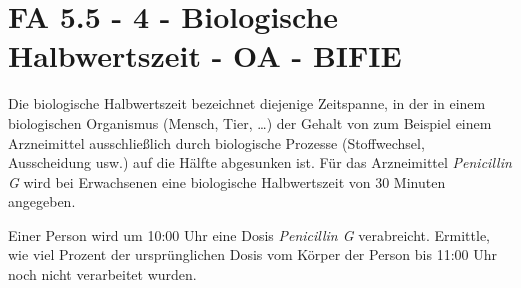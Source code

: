 \section{FA 5.5 - 4 - Biologische Halbwertszeit - OA - BIFIE}


\begin{beispiel}[FA 5.5]{1} %
Die biologische Halbwertszeit bezeichnet diejenige Zeitspanne, in der in einem biologischen
Organismus (Mensch, Tier, \ldots) der Gehalt von zum Beispiel einem Arzneimittel ausschließlich durch biologische Prozesse (Stoffwechsel, Ausscheidung usw.) auf die Hälfte abgesunken ist. Für das Arzneimittel \textit{Penicillin G} wird bei Erwachsenen eine biologische Halbwertszeit von 30 Minuten angegeben. 
\leer

Einer Person wird um 10:00 Uhr eine Dosis \textit{Penicillin G} verabreicht.
Ermittle, wie viel Prozent der ursprünglichen Dosis vom Körper der Person bis 11:00 Uhr noch nicht verarbeitet wurden.


\end{beispiel}